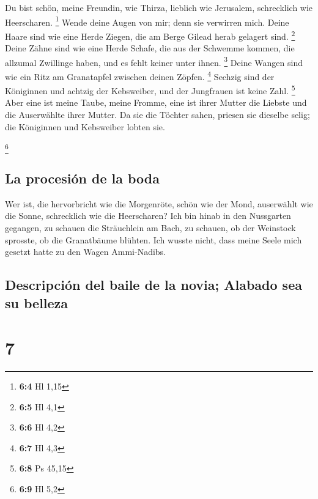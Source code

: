  Du bist schön, meine Freundin, wie Thirza, lieblich wie
Jerusalem, schrecklich wie Heerscharen. \footnote{\textbf{6:4} Hl 1,15}
 Wende deine Augen von mir; denn sie verwirren mich. Deine
Haare sind wie eine Herde Ziegen, die am Berge Gilead herab gelagert
sind. \footnote{\textbf{6:5} Hl 4,1}  Deine Zähne sind wie
eine Herde Schafe, die aus der Schwemme kommen, die allzumal Zwillinge
haben, und es fehlt keiner unter ihnen. \footnote{\textbf{6:6} Hl 4,2}
 Deine Wangen sind wie ein Ritz am Granatapfel zwischen
deinen Zöpfen. \footnote{\textbf{6:7} Hl 4,3}  Sechzig
sind der Königinnen und achtzig der Kebsweiber, und der Jungfrauen ist
keine Zahl. \footnote{\textbf{6:8} Ps 45,15}  Aber eine
ist meine Taube, meine Fromme, eine ist ihrer Mutter die Liebste und die
Auserwählte ihrer Mutter. Da sie die Töchter sahen, priesen sie dieselbe
selig; die Königinnen und Kebsweiber lobten sie.

\footnote{\textbf{6:9} Hl 5,2}

\hypertarget{la-procesiuxf3n-de-la-boda}{%
\subsection{La procesión de la boda}\label{la-procesiuxf3n-de-la-boda}}

 Wer ist, die hervorbricht wie die Morgenröte, schön wie
der Mond, auserwählt wie die Sonne, schrecklich wie die Heerscharen?
 Ich bin hinab in den Nussgarten gegangen, zu schauen die
Sträuchlein am Bach, zu schauen, ob der Weinstock sprosste, ob die
Granatbäume blühten.  Ich wusste nicht, dass meine Seele
mich gesetzt hatte zu den Wagen Ammi-Nadibs.

\hypertarget{descripciuxf3n-del-baile-de-la-novia-alabado-sea-su-belleza}{%
\subsection{Descripción del baile de la novia; Alabado sea su
belleza}\label{descripciuxf3n-del-baile-de-la-novia-alabado-sea-su-belleza}}

\hypertarget{section-6}{%
\section{7}\label{section-6}}

